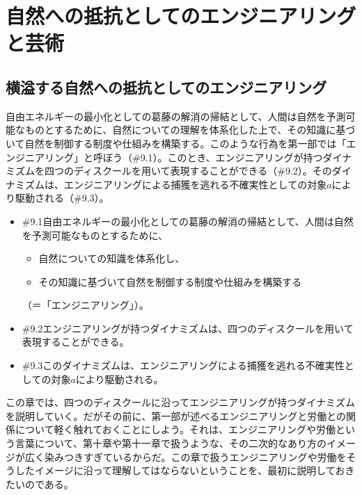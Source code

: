 \section{自然への抵抗としてのエンジニアリングと芸術}\label{ux81eaux7136ux3078ux306eux62b5ux6297ux3068ux3057ux3066ux306eux30a8ux30f3ux30b8ux30cbux30a2ux30eaux30f3ux30b0ux3068ux82b8ux8853}

\subsection{横溢する自然への抵抗としてのエンジニアリング}\label{ux6a2aux6ea2ux3059ux308bux81eaux7136ux3078ux306eux62b5ux6297ux3068ux3057ux3066ux306eux30a8ux30f3ux30b8ux30cbux30a2ux30eaux30f3ux30b0}

自由エネルギーの最小化としての葛藤の解消の帰結として、人間は自然を予測可能なものとするために、自然についての理解を体系化した上で、その知識に基づいて自然を制御する制度や仕組みを構築する。このような行為を第一部では「エンジニアリング」と呼ぼう（\#9.1）。このとき、エンジニアリングが持つダイナミズムを四つのディスクールを用いて表現することができる（\#9.2）。そのダイナミズムは、エンジニアリングによる捕獲を逃れる不確実性としての対象\(a\)により駆動される（\#9.3）。

\begin{note}{}
  \begin{itemize}
    \tightlist
    \item{\#9.1}自由エネルギーの最小化としての葛藤の解消の帰結として、人間は自然を予測可能なものとするために、
      \begin{itemize}
        \tightlist
        \item 自然についての知識を体系化し、
        \item その知識に基づいて自然を制御する制度や仕組みを構築する
      \end{itemize}（＝「エンジニアリング」）。
    \item{\#9.2}エンジニアリングが持つダイナミズムは、四つのディスクールを用いて表現することができる。
    \item{\#9.3}このダイナミズムは、エンジニアリングによる捕獲を逃れる不確実性としての対象$a$により駆動される。
  \end{itemize}
\end{note}

この章では、四つのディスクールに沿ってエンジニアリングが持つダイナミズムを説明していく。だがその前に、第一部が述べるエンジニアリングと労働との関係について軽く触れておくことにしよう。それは、エンジニアリングや労働という言葉について、第十章や第十一章で扱うような、その二次的なあり方のイメージが広く染みつきすぎているからだ。この章で扱うエンジニアリングや労働をそうしたイメージに沿って理解してはならないということを、最初に説明しておきたいのである。

